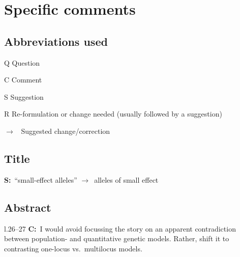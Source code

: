 \documentclass[11pt]{article}
\newenvironment{my_description}
{\begin{description}
  \setlength{\itemsep}{2pt}
  \setlength{\parskip}{0pt}
  \setlength{\parsep}{0pt}}
{\end{description}}
\newcommand{\ra}{$\rightarrow$\ }
\newcommand{\C}{\textbf{C:}\ }
\newcommand{\Q}{\textbf{Q:}\ }
\newcommand{\R}{\textbf{R:}\ }
\newcommand{\V}{\textbf{S:}\ }
\begin{document}
\section{Specific comments}

\subsection{Abbreviations used}
\begin{my_description}
	\item[Q] Question %
	\item[C] Comment %
	\item[S] Suggestion %
	\item[R] Re-formulation or change needed (usually followed by a suggestion) %
	\item[\ra] Suggested change/correction
\end{my_description}

\subsection{Title}
\V ``small-effect alleles'' \ra alleles of small effect

\subsection{Abstract}

\begin{my_description}
	\item[l.26--27] \C I would avoid focussing the story on an apparent contradiction between population- and quantitative genetic models. Rather, shift it to contrasting one-locus vs.\ multilocus models.
\end{my_description}
\end{document}
